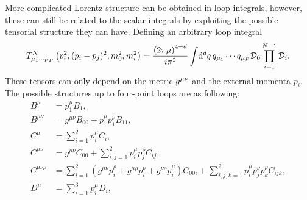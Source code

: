 \documentclass[../main.tex]{subfiles}
\begin{document}
            More complicated Lorentz structure can be obtained in loop integrals, however, these can still be related to the scalar integrals by exploiting the possible tensorial structure they can have.
            Defining an arbitrary loop integral
            \begin{equation}
                T^N_{\mu_1\cdots\mu_P}\left(p_i^2, (p_i-p_j)^2; m_0^2, m_i^2\right) = \frac{\left(2\pi \mu\right)^{4-d}}{i \pi^2} \int \!\mathrm{d}^d q\, q_{\mu_1}\cdots q_{\mu_P} \mathcal{D}_0 \prod_{i=1}^{N-1} \mathcal{D}_i.
            \end{equation}
            These tensors can only depend on the metric \(\tensor{g}{^\mu^\nu}\) and the external momenta \(p_i\).
            The possible structures up to four-point loops are as following:
            \begin{subequations}
                \begin{align}
                    B^\mu                & = p_1^\mu B_1,                                                                                                                                                                                                         \\
                    B^{\mu\nu}           & = g^{\mu\nu} B_{00} + p_1^\mu p_1^\nu B_{11},                                                                                                                                                                          \\
                    C^\mu                & = \sum_{i=1}^2 p_i^\mu C_i,                                                                                                                                                                                            \\
                    C^{\mu\nu}           & = g^{\mu\nu} C_{00} + \sum_{i,j=1}^{2} p_i^\mu p_j^\nu C_{ij},                                                                                                                                                         \\
                    C^{\mu\nu\rho}       & = \sum_{i=1}^2 (g^{\mu\nu} p_i^{\rho} + g^{\mu\rho} p_i^{\nu} + g^{\nu\rho} p_i^{\mu}) C_{00i} + \sum_{i,j,k=1}^2 p_i^\mu p_j^\nu p_k^\rho C_{ijk},                                                                    \\
                    D^\mu                & = \sum_{i=1}^3 p_i^\mu D_i,                                                                                                                                                                                            \\

\end{align}
\end{subequations}
\end{document}
